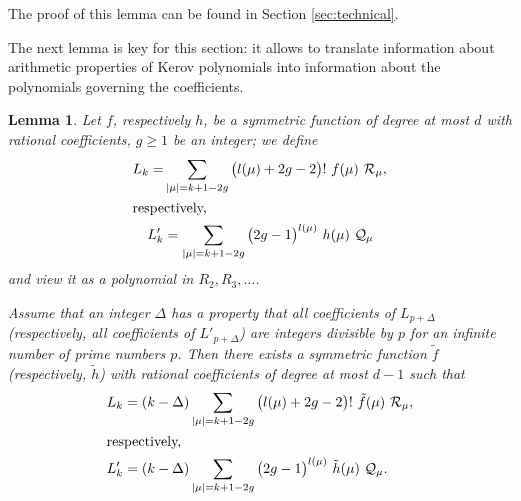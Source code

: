 \documentclass[12pt]{amsart}
\theoremstyle{plain}
\newtheorem{lemma}{Lemma}[section]
\theoremstyle{remark}
\begin{document}
The proof of this lemma can be found in Section \ref{sec:technical}.

The next lemma is key for this section: it allows to translate information
about arithmetic properties of Kerov polynomials into information about the
polynomials governing the coefficients.
\begin{lemma}
\label{lem:sie-dzieli}
Let $f$, respectively $h$, be a symmetric function of degree at most $d$ with
rational coefficients, $g\geq 1$ be an integer; we define
\begin{align*} L_{k} =  & \sum_{|\mu|=k+1-2g}
\big(l(\mu) + 2g - 2\big)!\ f(\mu)\ \mathcal{R}_\mu, \\
\intertext{respectively,}
L'_{k}&= \sum_{|\mu|=k+1-2g} \big(2g - 1\big)^{l(\mu)}\ h(\mu)\ \mathcal{Q}_\mu
\end{align*}
and view it as a polynomial in $R_2,R_3,\dots$.

Assume that an integer $\Delta$ has a property that all coefficients of
$L_{p+\Delta}$ (respectively, all coefficients of $L'_{p+\Delta}$) are integers
divisible by $p$ for an infinite number of prime numbers $p$. Then there exists
a symmetric function $\tilde{f}$ (respectively, $\tilde{h}$) with rational
coefficients of  degree at most $d-1$ such that
\begin{align*} L_{k} &= (k-\Delta) \sum_{|\mu|=k+1-2g}
\big(l(\mu) + 2g - 2\big)!\ \tilde{f}(\mu)\ \mathcal{R}_\mu, \\
\intertext{respectively,} 
L'_k&= (k-\Delta) \sum_{|\mu|=k+1-2g}
\big(2g - 1\big)^{l(\mu)}\ \tilde{h}(\mu)\ \mathcal{Q}_\mu.
\end{align*}
\end{lemma}
\end{document}
